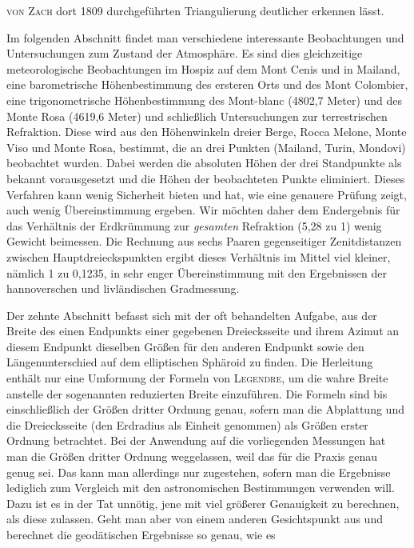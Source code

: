 %
\textsc{von} \textsc{Zach} dort 1809 durchgeführten Triangulierung deutlicher erkennen lässt.

Im folgenden Abschnitt findet man verschiedene interessante Beobachtungen und Untersuchungen zum Zustand der Atmosphäre. Es sind dies gleichzeitige meteorologische Beobachtungen im Hospiz auf dem Mont Cenis und in Mailand, eine barometrische Höhenbestimmung des ersteren Orts und des Mont Colombier, eine trigonometrische Höhenbestimmung des Mont-blanc (4802,7 Meter) und des Monte Rosa (4619,6 Meter) und schließlich Untersuchungen zur terrestrischen Refraktion. Diese wird aus den Höhenwinkeln dreier Berge, Rocca Melone, Monte Viso und Monte Rosa, bestimmt, die an drei Punkten (Mailand, Turin, Mondovi) beobachtet wurden. Dabei werden die absoluten Höhen der drei Standpunkte als bekannt vorausgesetzt und die Höhen der beobachteten Punkte eliminiert. Dieses Verfahren kann wenig Sicherheit bieten und hat, wie eine genauere Prüfung zeigt, auch wenig Übereinstimmung ergeben. Wir möchten daher dem Endergebnis für das Verhältnis der Erdkrümmung zur \textit{gesamten} Refraktion (5,28 zu 1) wenig Gewicht beimessen. Die Rechnung aus sechs Paaren gegenseitiger Zenitdistanzen zwischen Hauptdreieckspunkten ergibt dieses Verhältnis im Mittel viel kleiner, nämlich 1 zu 0,1235, in sehr enger Übereinstimmung mit den Ergebnissen der hannoverschen und livländischen Gradmessung.

Der zehnte Abschnitt befasst sich mit der oft behandelten Aufgabe, aus der Breite des einen Endpunkts einer gegebenen Dreiecksseite und ihrem Azimut an diesem Endpunkt dieselben Größen für den anderen Endpunkt sowie den Längenunterschied auf dem elliptischen Sphäroid zu finden. Die Herleitung enthält nur eine Umformung der Formeln von \textsc{Legendre}, um die wahre Breite anstelle der sogenannten reduzierten Breite einzuführen. Die Formeln sind bis einschließlich der Größen dritter Ordnung genau, sofern man die Abplattung und die Dreiecksseite (den Erdradius als Einheit genommen) als Größen erster Ordnung betrachtet. Bei der Anwendung auf die vorliegenden Messungen hat man die Größen dritter Ordnung weggelassen, weil das für die Praxis genau genug sei. Das kann man allerdings nur zugestehen, sofern man die Ergebnisse lediglich zum Vergleich mit den astronomischen Bestimmungen verwenden will. Dazu ist es in der Tat unnötig, jene mit viel größerer Genauigkeit zu berechnen, als diese zulassen. Geht man aber von einem anderen Gesichtspunkt aus und berechnet die geodätischen Ergebnisse so genau, wie es
